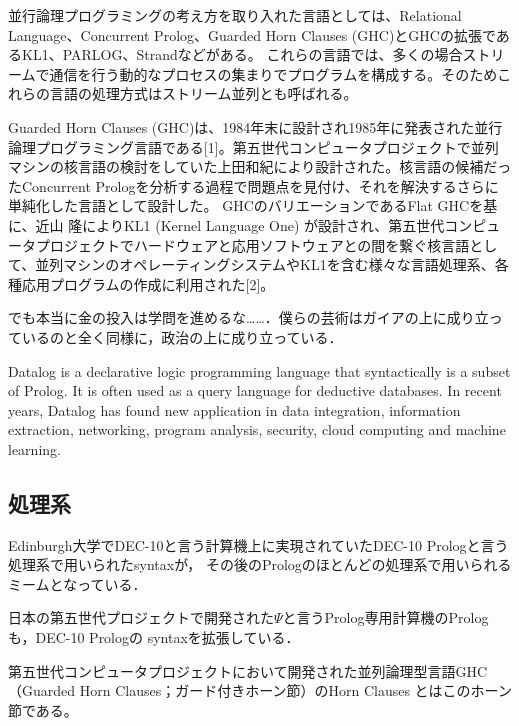 \documentclass[uplatex, 12pt, dvipdfmx]{jsreport}
\begin{document}
\begin{application}
    並行論理プログラミングの考え方を取り入れた言語としては、Relational Language、Concurrent Prolog、Guarded Horn Clauses (GHC)とGHCの拡張であるKL1、PARLOG、Strandなどがある。 これらの言語では、多くの場合ストリームで通信を行う動的なプロセスの集まりでプログラムを構成する。そのためこれらの言語の処理方式はストリーム並列とも呼ばれる。

    Guarded Horn Clauses (GHC)は、1984年末に設計され1985年に発表された並行論理プログラミング言語である[1]。第五世代コンピュータプロジェクトで並列マシンの核言語の検討をしていた上田和紀により設計された。核言語の候補だったConcurrent Prologを分析する過程で問題点を見付け、それを解決するさらに単純化した言語として設計した。
    GHCのバリエーションであるFlat GHCを基に、近山 隆によりKL1 (Kernel Language One) が設計され、第五世代コンピュータプロジェクトでハードウェアと応用ソフトウェアとの間を繋ぐ核言語として、並列マシンのオペレーティングシステムやKL1を含む様々な言語処理系、各種応用プログラムの作成に利用された[2]。
\end{application}
でも本当に金の投入は学問を進めるな……．僕らの芸術はガイアの上に成り立っているのと全く同様に，政治の上に成り立っている．

\begin{application}[Datalog]
    Datalog is a declarative logic programming language that syntactically is a subset of Prolog. It is often used as a query language for deductive databases. In recent years, Datalog has found new application in data integration, information extraction, networking, program analysis, security, cloud computing and machine learning.
\end{application}

\subsection{処理系}

\begin{history}[DEC-10]
Edinburgh大学でDEC-10と言う計算機上に実現されていたDEC-10 Prologと言う処理系で用いられたsyntaxが，
その後のPrologのほとんどの処理系で用いられるミームとなっている．
\end{history}

\begin{example}[$\Psi$]
    日本の第五世代プロジェクトで開発された$\Psi$と言うProlog専用計算機のPrologも，DEC-10 Prologの
    syntaxを拡張している．
\end{example}
\begin{remark}
    第五世代コンピュータプロジェクトにおいて開発された並列論理型言語GHC（Guarded Horn Clauses；ガード付きホーン節）のHorn Clauses とはこのホーン節である。
\end{remark}
\end{document}
